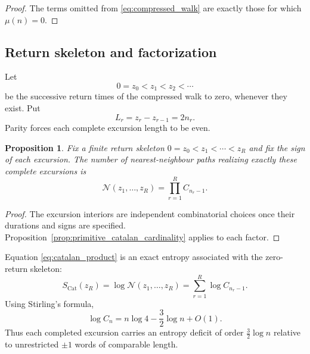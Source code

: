 \documentclass[11pt]{amsart}
\numberwithin{equation}{section}
\theoremstyle{plain}
\newtheorem{proposition}[theorem]{Proposition}
\theoremstyle{definition}
\theoremstyle{remark}
\newcommand{\Mob}{\mu}
\newcommand{\Cat}{C}
\begin{document}
\begin{proof}
The terms omitted from \eqref{eq:compressed_walk} are exactly those for which $\Mob(n)=0$.
\end{proof}

\subsection{Return skeleton and factorization}
\label{subsec:return_skeleton}

Let
\begin{equation}
0=z_0<z_1<z_2<\cdots
\label{eq:return_times}
\end{equation}
be the successive return times of the compressed walk to zero, whenever they exist.  Put
\begin{equation}
L_r=z_r-z_{r-1}=2n_r.
\label{eq:excursion_lengths}
\end{equation}
Parity forces each complete excursion length to be even.

\begin{proposition}
\label{prop:catalan_product}
Fix a finite return skeleton $0=z_0<z_1<\cdots<z_R$ and fix the sign of each excursion.  The number of nearest-neighbour paths realizing exactly these complete excursions is
\begin{equation}
\mathcal{N}(z_1,\ldots,z_R)
=
\prod_{r=1}^{R}\Cat_{n_r-1}.
\label{eq:catalan_product}
\end{equation}
\end{proposition}

\begin{proof}
The excursion interiors are independent combinatorial choices once their durations and signs are specified.  Proposition~\ref{prop:primitive_catalan_cardinality} applies to each factor.
\end{proof}

Equation \eqref{eq:catalan_product} is an exact entropy associated with the zero-return skeleton:
\begin{equation}
S_{\mathrm{Cat}}(z_R)
=
\log \mathcal{N}(z_1,\ldots,z_R)
=
\sum_{r=1}^{R}\log \Cat_{n_r-1}.
\label{eq:catalan_skeleton_entropy}
\end{equation}
Using Stirling's formula,
\begin{equation}
\log \Cat_n
=
n\log 4-\frac{3}{2}\log n+O(1).
\label{eq:catalan_entropy_asymptotic}
\end{equation}
Thus each completed excursion carries an entropy deficit of order $\frac32\log n$ relative to unrestricted $\pm1$ words of comparable length.
\end{document}

